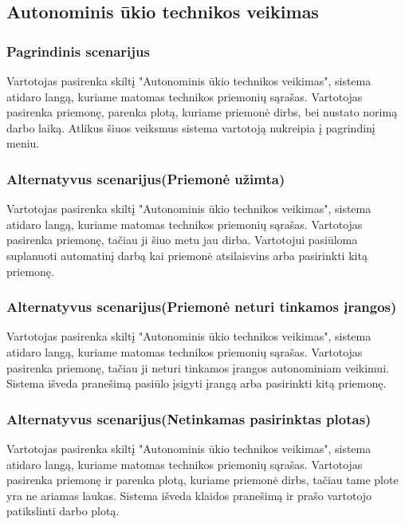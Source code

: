 \documentclass[oneside]{VUMIFPSkursinis}
\begin{document}
\subsection{Autonominis ūkio technikos veikimas}
\subsubsection{Pagrindinis scenarijus}
	Vartotojas pasirenka skiltį "Autonominis ūkio technikos veikimas", sistema atidaro langą, kuriame matomas technikos priemonių sąrašas. Vartotojas pasirenka priemonę, parenka plotą, kuriame priemonė dirbs, bei nustato norimą darbo laiką. Atlikus šiuos veiksmus sistema vartotoją nukreipia į pagrindinį meniu.
\subsubsection{Alternatyvus scenarijus(Priemonė užimta)}
	Vartotojas pasirenka skiltį "Autonominis ūkio technikos veikimas", sistema atidaro langą, kuriame matomas technikos priemonių sąrašas. Vartotojas pasirenka priemonę, tačiau ji šiuo metu jau dirba. Vartotojui pasiūloma suplanuoti automatinį darbą kai priemonė atsilaisvins arba pasirinkti kitą priemonę.
\subsubsection{Alternatyvus scenarijus(Priemonė neturi tinkamos įrangos)}
	Vartotojas pasirenka skiltį "Autonominis ūkio technikos veikimas", sistema atidaro langą, kuriame matomas technikos priemonių sąrašas. Vartotojas pasirenka priemonę, tačiau ji neturi tinkamos įrangos autonominiam veikimui. Sistema išveda pranešimą pasiūlo įsigyti įrangą arba pasirinkti kitą priemonę.
\subsubsection{Alternatyvus scenarijus(Netinkamas pasirinktas plotas)}
	Vartotojas pasirenka skiltį "Autonominis ūkio technikos veikimas", sistema atidaro langą, kuriame matomas technikos priemonių sąrašas. Vartotojas pasirenka priemonę ir parenka plotą, kuriame priemonė dirbs, tačiau tame plote yra ne ariamas laukas. Sistema išveda klaidos pranešimą ir prašo vartotojo patikslinti darbo plotą.
\end{document}
